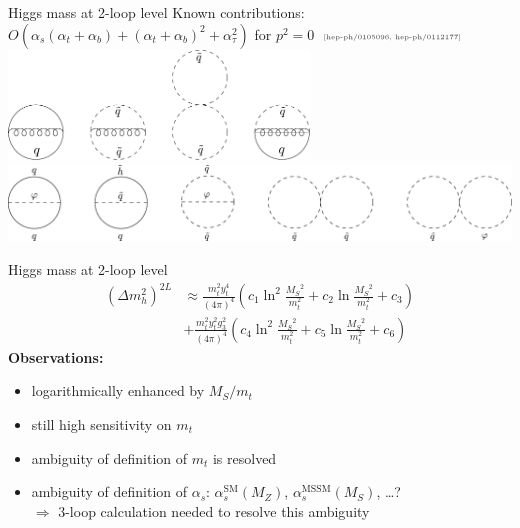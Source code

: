\documentclass[hyperref={pdfpagelabels=false},ngerman]{beamer}
\newcommand{\cmark}{\ding{51}}%
\newcommand{\ok}{\textcolor{darkgreen}{\cmark}}
\newcommand{\MS}{\ensuremath{M_S}}
\newcommand{\mycite}[1]{\ensuremath{\text{\textcolor{darkgray}{\tiny [#1]}}}}
\renewcommand{\emph}{\textbf}
\newcommand{\SM}{\ensuremath{\text{SM}}}
\newcommand{\MSSM}{\ensuremath{\text{MSSM}}}
\newcommand{\at}{\alpha_t}
\newcommand{\ab}{\alpha_b}
\newcommand{\atau}{\alpha_\tau}
\newcommand{\as}{\alpha_s}
\begin{document}
\begin{frame}{Higgs mass at 2-loop level}
  Known contributions: $O(\as (\at + \ab) + (\at+\ab)^2 + \atau^2)$
  for $p^2 = 0$ \mycite{hep-ph/0105096, hep-ph/0112177}
  \\[1em]
  \includegraphics[width=0.6\textwidth]{images/atas}\\[1em]
  \includegraphics[width=\textwidth]{images/atat}
\end{frame}

\begin{frame}{Higgs mass at 2-loop level}
  \begin{align*}
    (\Delta m_h^2)^{2L} &\approx
    \frac{m_t^2 y_t^4}{(4\pi)^4} \left(
      c_1 \ln^2\frac{\MS^2}{m_t^2}
      + c_2 \ln\frac{\MS^2}{m_t^2}
      + c_3
    \right) \\
    & +
    \frac{m_t^2 y_t^2 g_3^2}{(4\pi)^4} \left(
      c_4 \ln^2\frac{\MS^2}{m_t^2}
      + c_5 \ln\frac{\MS^2}{m_t^2}
      + c_6
    \right)
  \end{align*}
  \emph{Observations:}
  \begin{itemize}
  \item logarithmically enhanced by $\MS / m_t$
  \item still high sensitivity on $m_t$
  \item ambiguity of definition of $m_t$ is resolved \ok
  \item ambiguity of definition of $\as$: $\as^\SM(M_Z)$, $\as^\MSSM(\MS)$, \ldots ? \\
    $\Rightarrow$ 3-loop calculation needed to resolve this ambiguity
  \end{itemize}
\end{frame}
\end{document}
